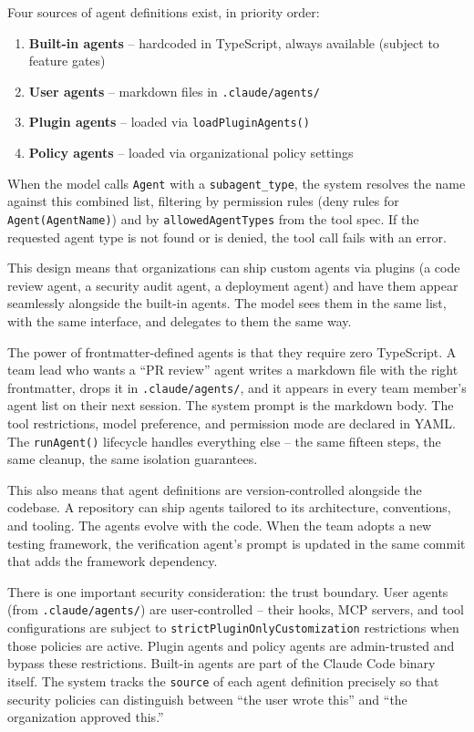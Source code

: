 \documentclass[
  english,
  11pt,
  letterpaper,
]{book}
\providecommand{\tightlist}{%
  \setlength{\itemsep}{0pt}\setlength{\parskip}{0pt}}
\begin{document}
Four sources of agent definitions exist, in priority order:

\begin{enumerate}
\def\labelenumi{\arabic{enumi}.}
\tightlist
\item
  \textbf{Built-in agents} -- hardcoded in TypeScript, always available
  (subject to feature gates)
\item
  \textbf{User agents} -- markdown files in \texttt{.claude/agents/}
\item
  \textbf{Plugin agents} -- loaded via \texttt{loadPluginAgents()}
\item
  \textbf{Policy agents} -- loaded via organizational policy settings
\end{enumerate}

When the model calls \texttt{Agent} with a \texttt{subagent\_type}, the
system resolves the name against this combined list, filtering by
permission rules (deny rules for \texttt{Agent(AgentName)}) and by
\texttt{allowedAgentTypes} from the tool spec. If the requested agent
type is not found or is denied, the tool call fails with an error.

This design means that organizations can ship custom agents via plugins
(a code review agent, a security audit agent, a deployment agent) and
have them appear seamlessly alongside the built-in agents. The model
sees them in the same list, with the same interface, and delegates to
them the same way.

The power of frontmatter-defined agents is that they require zero
TypeScript. A team lead who wants a ``PR review'' agent writes a
markdown file with the right frontmatter, drops it in
\texttt{.claude/agents/}, and it appears in every team member's agent
list on their next session. The system prompt is the markdown body. The
tool restrictions, model preference, and permission mode are declared in
YAML. The \texttt{runAgent()} lifecycle handles everything else -- the
same fifteen steps, the same cleanup, the same isolation guarantees.

This also means that agent definitions are version-controlled alongside
the codebase. A repository can ship agents tailored to its architecture,
conventions, and tooling. The agents evolve with the code. When the team
adopts a new testing framework, the verification agent's prompt is
updated in the same commit that adds the framework dependency.

There is one important security consideration: the trust boundary. User
agents (from \texttt{.claude/agents/}) are user-controlled -- their
hooks, MCP servers, and tool configurations are subject to
\texttt{strictPluginOnlyCustomization} restrictions when those policies
are active. Plugin agents and policy agents are admin-trusted and bypass
these restrictions. Built-in agents are part of the Claude Code binary
itself. The system tracks the \texttt{source} of each agent definition
precisely so that security policies can distinguish between ``the user
wrote this'' and ``the organization approved this.''
\end{document}
